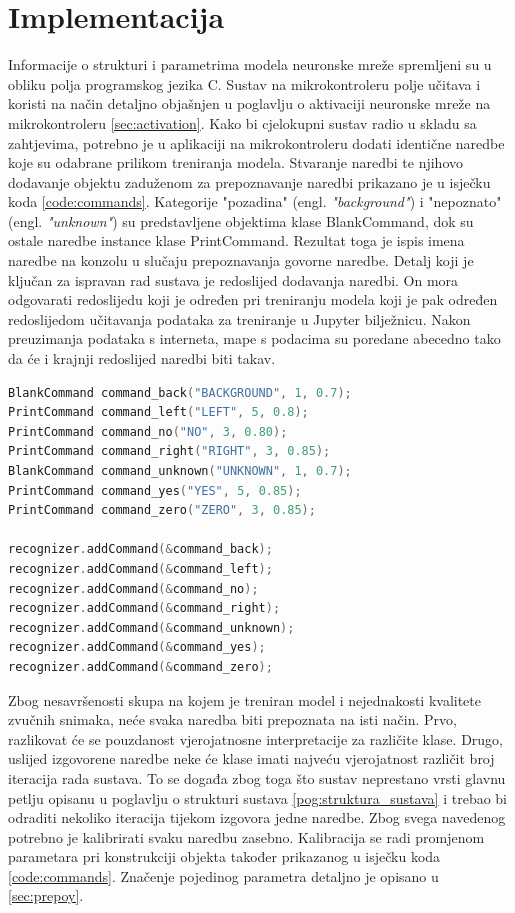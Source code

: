 \chapter{Implementacija}
\label{pog:implement}

Informacije o strukturi i parametrima modela neuronske mreže spremljeni su u obliku polja
programskog jezika C. Sustav na mikrokontroleru polje učitava i koristi na način detaljno objašnjen 
u poglavlju o aktivaciji neuronske mreže na mikrokontroleru \ref{sec:activation}.
Kako bi cjelokupni sustav radio u skladu sa zahtjevima, potrebno je u aplikaciji
na mikrokontroleru dodati identične naredbe koje su odabrane prilikom treniranja
modela. Stvaranje naredbi te njihovo dodavanje objektu zaduženom za prepoznavanje
naredbi prikazano je u isječku koda \ref{code:commands}. Kategorije "pozadina" (engl. \textit{"background"}) i
"nepoznato" (engl. \textit{"unknown"}) su predstavljene objektima klase BlankCommand, dok su ostale naredbe 
instance klase PrintCommand. Rezultat toga je ispis imena naredbe na konzolu u slučaju
prepoznavanja govorne naredbe. Detalj koji je ključan za ispravan rad sustava je redoslijed
dodavanja naredbi. On mora odgovarati redoslijedu koji je određen pri treniranju modela koji
je pak određen redoslijedom učitavanja podataka za treniranje u Jupyter bilježnicu. Nakon
preuzimanja podataka s interneta, mape s podacima su poredane abecedno tako da 
će i krajnji redoslijed naredbi biti takav.

\begin{lstlisting}[language=C++, caption=Stvaranje naredbi, label=code:commands]
BlankCommand command_back("BACKGROUND", 1, 0.7);
PrintCommand command_left("LEFT", 5, 0.8);
PrintCommand command_no("NO", 3, 0.80);
PrintCommand command_right("RIGHT", 3, 0.85);
BlankCommand command_unknown("UNKNOWN", 1, 0.7);
PrintCommand command_yes("YES", 5, 0.85);
PrintCommand command_zero("ZERO", 3, 0.85);

recognizer.addCommand(&command_back);
recognizer.addCommand(&command_left);
recognizer.addCommand(&command_no);
recognizer.addCommand(&command_right);
recognizer.addCommand(&command_unknown);
recognizer.addCommand(&command_yes);
recognizer.addCommand(&command_zero);
\end{lstlisting}

Zbog nesavršenosti skupa na kojem je treniran model i nejednakosti kvalitete
zvučnih snimaka, neće svaka naredba biti prepoznata na isti način. Prvo, razlikovat će
se pouzdanost vjerojatnosne interpretacije za različite klase. Drugo, uslijed izgovorene
naredbe neke će klase imati najveću vjerojatnost različit broj iteracija rada sustava.
To se događa zbog toga što sustav neprestano vrsti glavnu petlju opisanu u poglavlju
o strukturi sustava \ref{pog:struktura_sustava} i trebao bi odraditi nekoliko iteracija tijekom izgovora
jedne naredbe. Zbog svega navedenog potrebno je kalibrirati svaku naredbu zasebno.
Kalibracija se radi promjenom parametara pri konstrukciji objekta također prikazanog 
u isječku koda \ref{code:commands}. Značenje pojedinog parametra detaljno je opisano u 
\ref{sec:prepoy}. 

